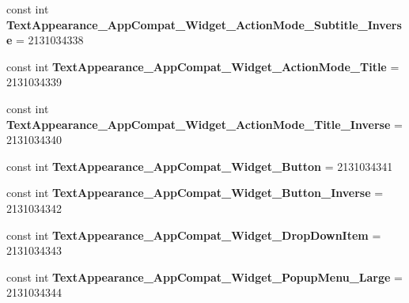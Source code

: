 \begin{DoxyCompactItemize}
\item 
\hypertarget{classClient_1_1Droid_1_1Resource_1_1Style_a71c388cdec0c3094d90f77858792bbbe}{}const int {\bfseries Text\+Appearance\+\_\+\+App\+Compat\+\_\+\+Widget\+\_\+\+Action\+Mode\+\_\+\+Subtitle\+\_\+\+Inverse} = 2131034338\label{classClient_1_1Droid_1_1Resource_1_1Style_a71c388cdec0c3094d90f77858792bbbe}

\item 
\hypertarget{classClient_1_1Droid_1_1Resource_1_1Style_ab8a31a0d416fd4e009cb8cf92ec1638d}{}const int {\bfseries Text\+Appearance\+\_\+\+App\+Compat\+\_\+\+Widget\+\_\+\+Action\+Mode\+\_\+\+Title} = 2131034339\label{classClient_1_1Droid_1_1Resource_1_1Style_ab8a31a0d416fd4e009cb8cf92ec1638d}

\item 
\hypertarget{classClient_1_1Droid_1_1Resource_1_1Style_a2882fa2f80ae965a48054fdfba17d5be}{}const int {\bfseries Text\+Appearance\+\_\+\+App\+Compat\+\_\+\+Widget\+\_\+\+Action\+Mode\+\_\+\+Title\+\_\+\+Inverse} = 2131034340\label{classClient_1_1Droid_1_1Resource_1_1Style_a2882fa2f80ae965a48054fdfba17d5be}

\item 
\hypertarget{classClient_1_1Droid_1_1Resource_1_1Style_ac8472584f052d072ff45d94ca85890a2}{}const int {\bfseries Text\+Appearance\+\_\+\+App\+Compat\+\_\+\+Widget\+\_\+\+Button} = 2131034341\label{classClient_1_1Droid_1_1Resource_1_1Style_ac8472584f052d072ff45d94ca85890a2}

\item 
\hypertarget{classClient_1_1Droid_1_1Resource_1_1Style_a97ec87e7f0720c7915a812732ea08089}{}const int {\bfseries Text\+Appearance\+\_\+\+App\+Compat\+\_\+\+Widget\+\_\+\+Button\+\_\+\+Inverse} = 2131034342\label{classClient_1_1Droid_1_1Resource_1_1Style_a97ec87e7f0720c7915a812732ea08089}

\item 
\hypertarget{classClient_1_1Droid_1_1Resource_1_1Style_ab97ce7ce191ff4f0c00a5d22d501530b}{}const int {\bfseries Text\+Appearance\+\_\+\+App\+Compat\+\_\+\+Widget\+\_\+\+Drop\+Down\+Item} = 2131034343\label{classClient_1_1Droid_1_1Resource_1_1Style_ab97ce7ce191ff4f0c00a5d22d501530b}

\item 
\hypertarget{classClient_1_1Droid_1_1Resource_1_1Style_a16df798bc54f1cc1e7490fbc95300f97}{}const int {\bfseries Text\+Appearance\+\_\+\+App\+Compat\+\_\+\+Widget\+\_\+\+Popup\+Menu\+\_\+\+Large} = 2131034344\label{classClient_1_1Droid_1_1Resource_1_1Style_a16df798bc54f1cc1e7490fbc95300f97}


\end{DoxyCompactItemize}
